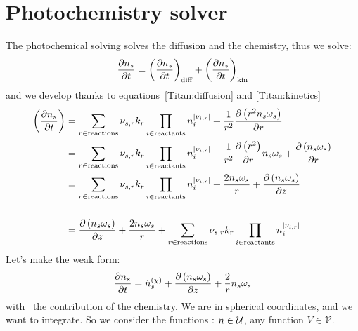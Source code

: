 \section{Photochemistry solver}

The photochemical solving solves the diffusion and the chemistry, thus we solve:
\begin{equation}
\frac{\partial n_s}{\partial t} = \left(\frac{\partial n_s}{\partial t}\right)_\text{diff} + \left(\frac{\partial n_s}{\partial t}\right)_\text{kin}
\end{equation}
and we develop thanks to equations~\ref{Titan:diffusion} and \ref{Titan:kinetics}
\begin{equation}
\begin{split}
\left(\frac{\partial n_s}{\partial t}\right) & = \sum_{r\in \text{reactions}} {\nu_{s,r}}k_{r} \prod_{i\in\text{reactants}}n_i^{|{\nu_{i,r}}|} +
                                     \frac{1}{r^2}\frac{\partial\left(r^2n_s\omega_s\right)}{\partial r} \\
                                 & = \sum_{r\in \text{reactions}} {\nu_{s,r}} k_r\prod_{i\in\text{reactants}}n_i^{|{\nu_{i,r}}|} +
                                     \frac{1}{r^2}\frac{\partial\left(r^2\right)}{\partial r}n_s\omega_s + \frac{\partial\left(n_s\omega_s\right)}{\partial r} \\
                                 & = \sum_{r\in \text{reactions}} {\nu_{s,r}} k_{r}\prod_{i\in\text{reactants}}n_i^{|{\nu_{i,r}}|} +
                                     \frac{2n_s\omega_s}{r} + \frac{\partial\left(n_s\omega_s\right)}{\partial z} \\[\baselineskip]
                                 & = \frac{\partial\left(n_s\omega_s\right)}{\partial z} + \frac{2n_s\omega_s}{r} + \sum_{r\in \text{reactions}} {\nu_{s,r}} k_{r}\prod_{i\in\text{reactants}}n_i^{|{\nu_{i,r}}|} 
\end{split}
\end{equation}
Let's make the weak form:
\begin{equation}
\frac{\partial n_s}{\partial t} = \dot{n}^{(\chi)}_s + \frac{\partial\left(n_s\omega_s\right)}{\partial z} + \frac{2}{r}n_s\omega_s
\label{Titan:photochem_eq}
\end{equation}
with \omegadot\ the contribution of the chemistry.
We are in spherical coordinates, and we want to integrate.
So we consider the functions \conc:
$n \in \mathcal{U}$, any function $V \in \mathcal{V}$.
